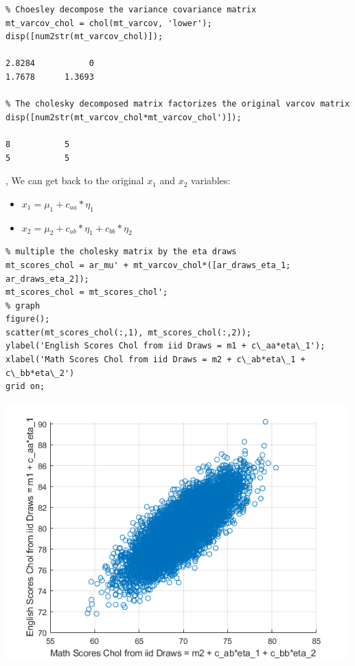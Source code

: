 \documentclass[
]{book}
\begin{document}
\begin{verbatim}
% Choesley decompose the variance covariance matrix
mt_varcov_chol = chol(mt_varcov, 'lower');
disp([num2str(mt_varcov_chol)]);

2.8284           0
1.7678      1.3693

% The cholesky decomposed matrix factorizes the original varcov matrix
disp([num2str(mt_varcov_chol*mt_varcov_chol')]);

8           5
5           5
\end{verbatim}

, We can get back to the original \(x_1\) and \(x_2\) variables:

\begin{itemize}
\item
  \(\displaystyle x_1 =\mu_1 +c_{aa} *\eta_1\)
\item
  \(\displaystyle x_2 =\mu_2 +c_{ab} *\eta_1 +c_{bb} *\eta_2\)
\end{itemize}

\begin{verbatim}
% multiple the cholesky matrix by the eta draws
mt_scores_chol = ar_mu' + mt_varcov_chol*([ar_draws_eta_1; ar_draws_eta_2]);
mt_scores_chol = mt_scores_chol';
% graph
figure();
scatter(mt_scores_chol(:,1), mt_scores_chol(:,2));
ylabel('English Scores Chol from iid Draws = m1 + c\_aa*eta\_1');
xlabel('Math Scores Chol from iid Draws = m2 + c\_ab*eta\_1 + c\_bb*eta\_2')
grid on;
\end{verbatim}

\includegraphics[width=5.20833in,height=\textheight]{img/fs_cholesky_decomposition_images/figure_2.png}
\end{document}
